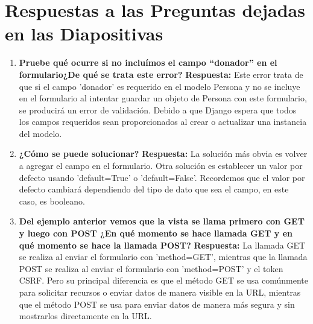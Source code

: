 \documentclass{article}
\begin{document}
	\section{Respuestas a las Preguntas dejadas en las Diapositivas}
    \begin{enumerate}
      \item \textbf{Pruebe qué ocurre si no incluímos el campo “donador” en el formulario¿De qué se trata este error?}
        \newline
        \textbf{Respuesta: }Este error trata de que si el campo 'donador' es requerido en el modelo Persona y no se 
        incluye en el formulario al intentar guardar un objeto de Persona con este formulario, se producirá un error 
        de validación. Debido a que Django espera que todos los campos requeridos sean proporcionados al crear o actualizar 
        una instancia del modelo.
      \item \textbf{¿Cómo se puede solucionar?}
        \newline
        \textbf{Respuesta: }La solución más obvia es volver a agregar el campo en el formulario. 
        Otra solución es establecer un valor por defecto usando 'default=True' o 'default=False'. Recordemos que el valor 
        por defecto cambiará dependiendo del tipo de dato que sea el campo, en este caso, es booleano.
      \item \textbf{Del ejemplo anterior vemos que la vista se llama primero con GET y luego con POST ¿En qué momento se hace llamada GET y en qué momento se hace la llamada POST?}
        \newline
        \textbf{Respuesta: }La llamada GET se realiza al enviar el formulario con 'method=GET', mientras que la llamada POST se 
        realiza al enviar el formulario con 'method=POST' y el token CSRF. Pero su principal diferencia es que el método GET 
        se usa comúnmente para solicitar recursos o enviar datos de manera visible en la URL, mientras que el método POST se 
        usa para enviar datos de manera más segura y sin mostrarlos directamente en la URL.  
    \end{enumerate}

\end{document}
